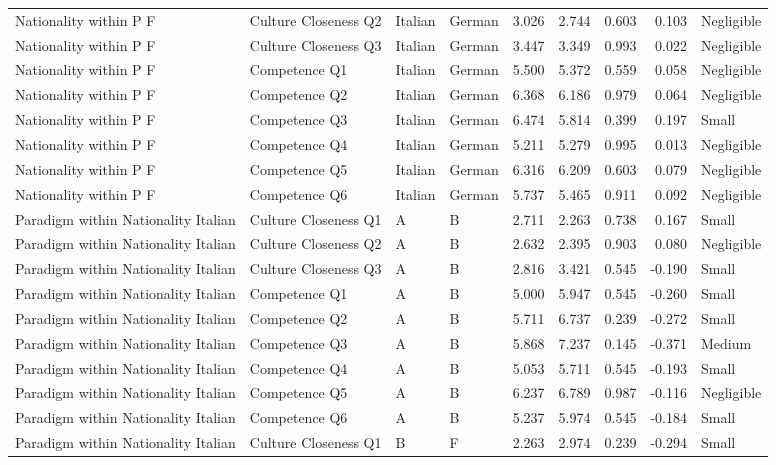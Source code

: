 \begin{table}
\begin{tabular}{llllrrrrl}
Nationality  within  P  F & Culture  Closeness  Q2 & Italian & German & 3.026 & 2.744 & 0.603 & 0.103 & Negligible \\
Nationality  within  P  F & Culture  Closeness  Q3 & Italian & German & 3.447 & 3.349 & 0.993 & 0.022 & Negligible \\
Nationality  within  P  F & Competence  Q1 & Italian & German & 5.500 & 5.372 & 0.559 & 0.058 & Negligible \\
Nationality  within  P  F & Competence  Q2 & Italian & German & 6.368 & 6.186 & 0.979 & 0.064 & Negligible \\
Nationality  within  P  F & Competence  Q3 & Italian & German & 6.474 & 5.814 & 0.399 & 0.197 & Small \\
Nationality  within  P  F & Competence  Q4 & Italian & German & 5.211 & 5.279 & 0.995 & 0.013 & Negligible \\
Nationality  within  P  F & Competence  Q5 & Italian & German & 6.316 & 6.209 & 0.603 & 0.079 & Negligible \\
Nationality  within  P  F & Competence  Q6 & Italian & German & 5.737 & 5.465 & 0.911 & 0.092 & Negligible \\
Paradigm  within  Nationality  Italian & Culture  Closeness  Q1 & A & B & 2.711 & 2.263 & 0.738 & 0.167 & Small \\
Paradigm  within  Nationality  Italian & Culture  Closeness  Q2 & A & B & 2.632 & 2.395 & 0.903 & 0.080 & Negligible \\
Paradigm  within  Nationality  Italian & Culture  Closeness  Q3 & A & B & 2.816 & 3.421 & 0.545 & -0.190 & Small \\
Paradigm  within  Nationality  Italian & Competence  Q1 & A & B & 5.000 & 5.947 & 0.545 & -0.260 & Small \\
Paradigm  within  Nationality  Italian & Competence  Q2 & A & B & 5.711 & 6.737 & 0.239 & -0.272 & Small \\
Paradigm  within  Nationality  Italian & Competence  Q3 & A & B & 5.868 & 7.237 & 0.145 & -0.371 & Medium \\
Paradigm  within  Nationality  Italian & Competence  Q4 & A & B & 5.053 & 5.711 & 0.545 & -0.193 & Small \\
Paradigm  within  Nationality  Italian & Competence  Q5 & A & B & 6.237 & 6.789 & 0.987 & -0.116 & Negligible \\
Paradigm  within  Nationality  Italian & Competence  Q6 & A & B & 5.237 & 5.974 & 0.545 & -0.184 & Small \\
Paradigm  within  Nationality  Italian & Culture  Closeness  Q1 & B & F & 2.263 & 2.974 & 0.239 & -0.294 & Small \\

\end{tabular}
\end{table}
